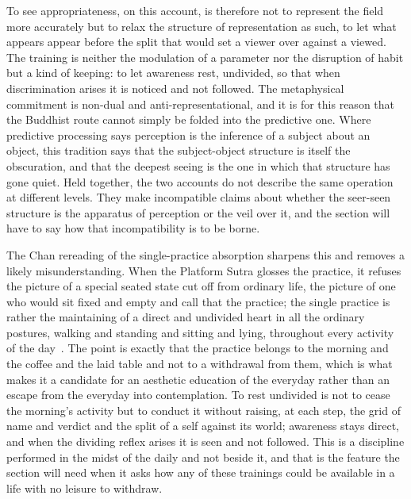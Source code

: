 To see appropriateness, on this account, is therefore not to represent the field more accurately but to relax the structure of representation as such, to let what appears appear before the split that would set a viewer over against a viewed. The training is neither the modulation of a parameter nor the disruption of habit but a kind of keeping: to let awareness rest, undivided, so that when discrimination arises it is noticed and not followed. The metaphysical commitment is non-dual and anti-representational, and it is for this reason that the Buddhist route cannot simply be folded into the predictive one. Where predictive processing says perception is the inference of a subject about an object, this tradition says that the subject-object structure is itself the obscuration, and that the deepest seeing is the one in which that structure has gone quiet. Held together, the two accounts do not describe the same operation at different levels. They make incompatible claims about whether the seer-seen structure is the apparatus of perception or the veil over it, and the section will have to say how that incompatibility is to be borne.

The Chan rereading of the single-practice absorption sharpens this and removes a likely misunderstanding. When the Platform Sutra glosses the practice, it refuses the picture of a special seated state cut off from ordinary life, the picture of one who would sit fixed and empty and call that the practice; the single practice is rather the maintaining of a direct and undivided heart in all the ordinary postures, walking and standing and sitting and lying, throughout every activity of the day~\parencite{platform_sutra}. The point is exactly that the practice belongs to the morning and the coffee and the laid table and not to a withdrawal from them, which is what makes it a candidate for an aesthetic education of the everyday rather than an escape from the everyday into contemplation. To rest undivided is not to cease the morning's activity but to conduct it without raising, at each step, the grid of name and verdict and the split of a self against its world; awareness stays direct, and when the dividing reflex arises it is seen and not followed. This is a discipline performed in the midst of the daily and not beside it, and that is the feature the section will need when it asks how any of these trainings could be available in a life with no leisure to withdraw.

